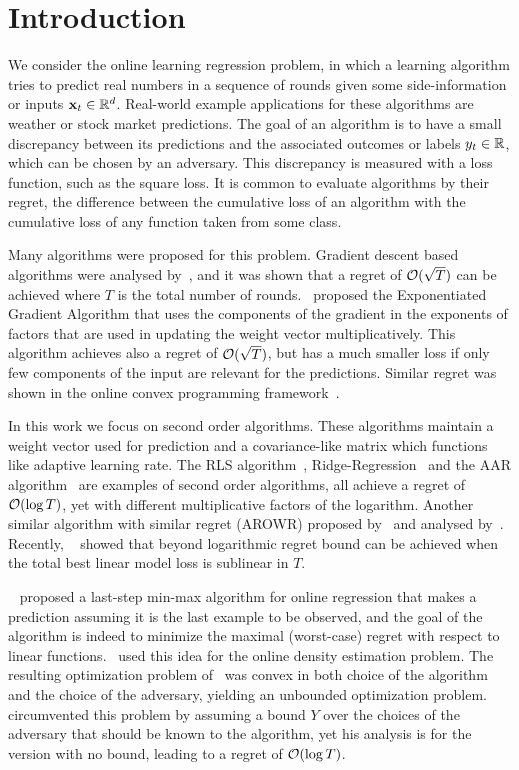 \chapter{Introduction}

We consider the online learning regression problem, in which a learning algorithm tries to predict real numbers in a sequence of rounds given some side-information or inputs $\mathbf{x}_{t}\in\mathbb{R}^d$. Real-world example applications for these algorithms are weather or stock market predictions. The goal of an algorithm is to have a small discrepancy between its predictions and the associated outcomes or labels  $y_{t}\in\mathbb{R}$, which can be chosen by an adversary. This discrepancy is measured with a loss function, such as the square loss. It is common to evaluate algorithms by their regret, the difference between the cumulative loss of an algorithm with the cumulative loss of any function taken from some class.

Many algorithms were proposed for this problem. Gradient descent based algorithms were analysed by~\cite{Nicolo_Warmuth}, and it was shown that a regret of ${\mathcal{O}}(\sqrt{T})$ can be achieved where $T$ is the total number of rounds.~\cite{Kiv_War} proposed the Exponentiated Gradient Algorithm that uses the components of the gradient in the exponents of factors that are used in updating the weight vector multiplicatively. This algorithm achieves also a regret of ${\mathcal{O}}(\sqrt{T})$, but has a much smaller loss if only few components of the input are relevant for the predictions. Similar regret was shown in the online convex programming framework~\citep{Zinkevich03onlineconvex}.

In this work we focus on second order algorithms. These algorithms maintain a weight vector used for prediction and a covariance-like matrix which functions like adaptive learning rate. The RLS algorithm~\citep{Hayes}, Ridge-Regression~\citep{Foster91} and the AAR algorithm~\citep{Vovk97,Vovk01} are examples of second order algorithms, all achieve a regret of ${\mathcal{O}}(\log{T})$, yet with different multiplicative factors of the logarithm. Another similar algorithm with similar regret (AROWR) proposed by~\cite{VaitsCr11} and analysed by~\cite{CrammerKuDr12}. Recently, ~\cite{OrabonaCBG12} showed
that beyond logarithmic regret bound can be achieved when the total
best linear model loss is sublinear in $T$.

~\cite{Forster} proposed a last-step min-max algorithm for online regression that makes a prediction assuming it is the last example to be observed, and the goal of the algorithm is indeed to minimize the maximal (worst-case) regret with respect to linear functions.~\cite{TakimotoW00} used this idea for the online density estimation problem. The resulting optimization problem of~\cite{Forster} was convex in both choice of the algorithm and the choice of the adversary, yielding an unbounded optimization problem.~\cite{Forster} circumvented this problem by assuming a bound $Y$ over the choices of the adversary that should be known to the algorithm, yet his analysis is for the version with no bound, leading to a regret of ${\mathcal{O}}(\log{T})$.

